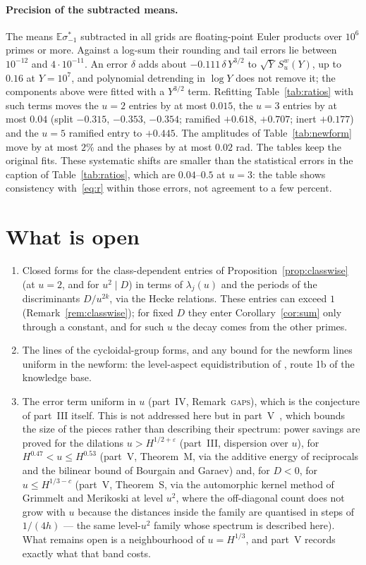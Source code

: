 \documentclass[11pt,a4paper]{article}
\theoremstyle{remark}\newtheorem{remark}[theorem]{Remark}
\begin{document}
\paragraph{Precision of the subtracted means.} The means $\mathbb E\sigma^*_{-1}$ subtracted in all grids are floating-point Euler
products over $10^6$ primes or more. Against a log-sum their rounding and tail errors lie between $10^{-12}$ and $4\cdot10^{-11}$. An
error $\delta$ adds about $-0.111\,\delta\,Y^{3/2}$ to $\sqrt Y\,S^w_u(Y)$, up to $0.16$ at $Y=10^7$, and polynomial detrending in $\log Y$
does not remove it; the components above were fitted with a $Y^{3/2}$ term. Refitting Table~\ref{tab:ratios} with such terms moves
the $u=2$ entries by at most $0.015$, the $u=3$ entries by at most $0.04$ (split $-0.315$, $-0.353$, $-0.354$; ramified $+0.618$,
$+0.707$; inert $+0.177$) and the $u=5$ ramified entry to $+0.445$. The amplitudes of Table~\ref{tab:newform} move by at most $2\%$
and the phases by at most $0.02$ rad. The tables keep the original fits. These systematic shifts are smaller than the statistical errors in the caption
of Table~\ref{tab:ratios}, which are $0.04$--$0.5$ at $u=3$: the table shows consistency with~\eqref{eq:r} within those errors, not
agreement to a few percent.

\section{What is open}\label{sec:open}
\begin{enumerate}
\item Closed forms for the
class-dependent entries of Proposition~\ref{prop:classwise} (at $u=2$, and for $u^2\mid D$) in terms of $\lambda_j(u)$ and the
periods of the discriminants $D/u^{2k}$, via the Hecke relations. These entries can exceed $1$ (Remark~\ref{rem:classwise}); for
fixed $D$ they enter Corollary~\ref{cor:sum} only through a constant, and for such $u$ the decay comes from the other primes.
\item The lines of the cycloidal-group forms, and any bound for the newform lines uniform in the newform: the level-aspect
equidistribution of \cite{LiuMasriYoung2013,HumphriesNordentoft2025}, route 1b of the knowledge base.
\item The error term uniform in $u$ (part~IV, Remark~\textsc{gaps}), which is the conjecture of part~III itself. This is not addressed here but in
part~V~\cite{ReichardtV}, which bounds the size of the pieces rather than describing their spectrum: power savings are proved for the dilations
$u>H^{1/2+\varepsilon}$ (part~III, dispersion over $u$), for $H^{0.47}<u\le H^{0.53}$ (part~V, Theorem~M, via the additive energy of reciprocals and the
bilinear bound of Bourgain and Garaev) and, for $D<0$, for $u\le H^{1/3-c}$ (part~V, Theorem~S, via the automorphic kernel method of Grimmelt and
Merikoski at level $u^2$, where the off-diagonal count does not grow with $u$ because the distances inside the family are quantised in steps of
$1/(4h)$ --- the same level-$u^2$ family whose spectrum is described here). What remains open is a neighbourhood of $u=H^{1/3}$, and part~V
records exactly what that band costs.
\end{enumerate}
\end{document}
